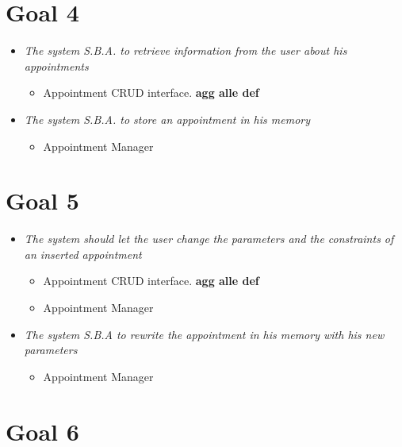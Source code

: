 \section{Goal 4}

\begin{itemize}

\item \textit{The system S.B.A. to retrieve information from the user about his appointments}

\begin{itemize}
\item Appointment CRUD interface.  \textbf{agg alle def}
\end{itemize}

\item \textit{The system S.B.A. to store an appointment in his memory}

\begin{itemize}
\item Appointment Manager
\end{itemize}

\end{itemize}


\section{Goal 5}

\begin{itemize}

\item \textit{The system should let the user change the parameters and the constraints of an inserted appointment}

\begin{itemize}
\item Appointment CRUD interface.  \textbf{agg alle def}
\item Appointment Manager
\end{itemize}

\item \textit{The system S.B.A to rewrite the appointment in his memory with his new parameters}

\begin{itemize}
\item Appointment Manager
\end{itemize}

\end{itemize}


\section{Goal 6}

